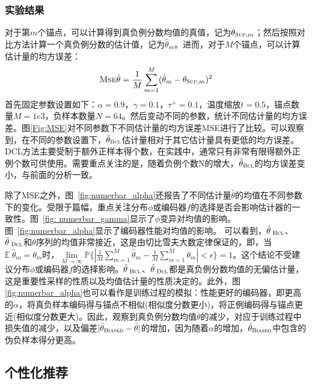 \subsubsection{实验结果}
对于第$m$个锚点，可以计算得到真负例分数均值的真值，记为$\theta_{\textsc{Sup}, m}$；然后按照对比方法计算一个真负例分数的估计值，记为$\hat{\theta}_{m}$。进而，对于$M$个锚点，可以计算估计量的均方误差：
\[\textsc{Mse}\hat{\theta} = \frac{1}{M}\sum_{m=1}^M (\hat{\theta}_{m} -\theta_{\textsc{Sup}, m})^2 \]
首先固定参数设置如下：$\alpha=0.9$，$\gamma=0.1$，$\tau^+=0.1$，温度缩放$t=0.5$，锚点数量$M=1e3$，负样本数量$N=64$。然后变动不同的参数，统计不同估计量的均方误差。图\ref{Fig:MSE}对不同参数下不同估计量的均方误差MSE进行了比较。可以观察到，在不同的参数设置下，$\hat{\theta}_{\textsc{Bcl}}$估计量相对于其它估计量具有更低的均方误差。DCL方法主要受制于额外正样本得个数，在实践中，通常只有非常有限得额外正例个数可供使用。需要重点关注的是，随着负例个数N的增大，$\hat{\theta}_{\textsc{Bcl}}$的均方误差变小，与前面的分析一致。

除了MSE之外，图~\ref{fig:numerbar_alpha}还报告了不同估计量$\hat\theta$的均值在不同参数下的变化。受限于篇幅，重点关注分布$\phi$或编码器$f$的选择是否会影响估计器的一致性。图~\ref{fig: numerbar_gamma}显示了$\phi$变异对均值的影响。图~\ref{fig:numerbar_alpha}显示了编码器性能对均值的影响。
可以看到，$\hat\theta_\textsc{~Bcl}$、$\hat\theta_\textsc{~Dcl}$和$\theta$序列的均值非常接近，这是由切比雪夫大数定律保证的，即，当$\mathbb E ~\hat\theta_m = \theta_m$时，$\lim\limits_{M\rightarrow\infty} \mathbb{P}\{|\frac{1}{M}\sum_{m=1}^{M} \hat{\theta}_m-\frac{1}{M}\sum_{m=1}^{M} \theta_m |< \epsilon \} =1
$。这个结论不受建议分布$\phi$或编码器$f$的选择影响。$\hat\theta_\textsc{~Bcl}$、$\hat\theta_\textsc{~Dcl}$都是真负例分数均值的无偏估计量，这是重要性采样的性质以及均值估计量的性质决定的。此外，图\ref{fig:numerbar_alpha}也可以看作是训练过程的模拟：性能更好的编码器，即更高的$\alpha$，将真负样本编码得与锚点不相似(相似度分数更小)，将正例编码得与锚点更近(相似度分数更大)。因此，观察到真负例分数均值$\bar\theta$的减少，对应于训练过程中损失值的减少，以及偏差$|\bar\theta_\textsc{Biased} -\bar\theta|$的增加，因为随着$\alpha$的增加，$\bar\theta_\textsc{Biased}$中包含的伪负样本得分更高。



\subsection{个性化推荐}
